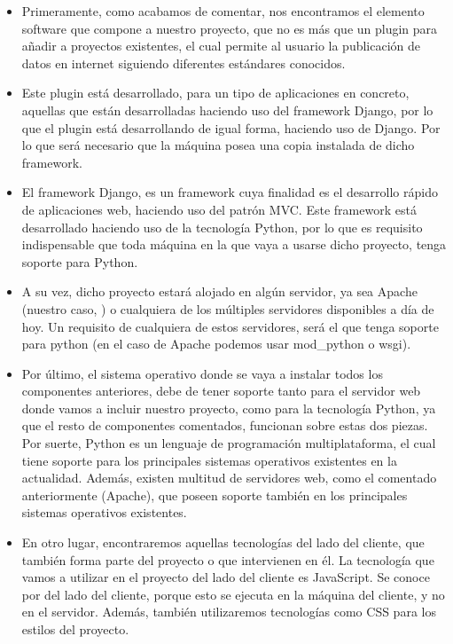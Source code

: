 \begin{itemize}
    \item Primeramente, como acabamos de comentar, nos encontramos el elemento
        software que compone a nuestro proyecto, que no es más que un plugin
        para añadir a proyectos existentes, el cual permite al usuario la
        publicación de datos en internet siguiendo diferentes estándares
        conocidos.
    \item Este plugin está desarrollado, para un tipo de aplicaciones en
        concreto, aquellas que están desarrolladas haciendo uso del framework
        Django, por lo que el plugin está desarrollando de igual forma, haciendo
        uso de Django. Por lo que será necesario que la máquina posea una copia
        instalada de dicho framework.
    \item El framework Django, es un framework cuya finalidad es el desarrollo
        rápido de aplicaciones web, haciendo uso del patrón MVC. Este framework
        está desarrollado haciendo uso de la tecnología Python, por lo que es
        requisito indispensable que toda máquina en la que vaya a usarse dicho
        proyecto, tenga soporte para Python.
    \item A su vez, dicho proyecto estará alojado en algún servidor, ya sea
        Apache (nuestro caso, ) o cualquiera de los múltiples servidores
        disponibles a día de hoy. Un requisito de cualquiera de estos
        servidores, será el que tenga soporte para python (en el caso de Apache
        podemos usar mod\_python o wsgi).
    \item Por último, el sistema operativo donde se vaya a instalar todos los
        componentes anteriores, debe de tener soporte tanto para el servidor web
        donde vamos a incluir nuestro proyecto, como para la tecnología Python,
        ya que el resto de componentes comentados, funcionan sobre estas dos
        piezas. Por suerte, Python es un lenguaje de programación
        multiplataforma, el cual tiene soporte para los principales sistemas
        operativos existentes en la actualidad. Además, existen multitud de
        servidores web, como el comentado anteriormente (Apache), que poseen
        soporte también en los principales sistemas operativos existentes.
    \item En otro lugar, encontraremos aquellas tecnologías del lado del
        cliente, que también forma parte del proyecto o que intervienen en él.
        La tecnología que vamos a utilizar en el proyecto del lado del cliente
        es JavaScript. Se conoce por del lado del cliente, porque esto se
        ejecuta en la máquina del cliente, y no en el servidor. Además, también
        utilizaremos tecnologías como CSS para los estilos del proyecto.
\end{itemize}


